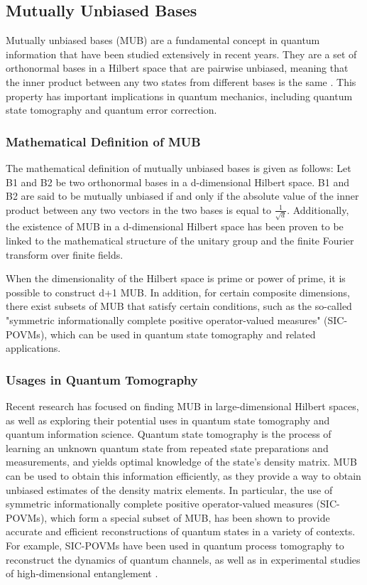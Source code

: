 \subsection{Mutually Unbiased Bases}\label{subsec:mutually-unbiased-bases}
Mutually unbiased bases (MUB) are a fundamental concept in quantum information that have been studied extensively in recent years.
They are a set of orthonormal bases in a Hilbert space that are pairwise unbiased, meaning that the inner product between
any two states from different bases is the same \cite{durt2010mutually}.
This property has important implications in quantum mechanics,
including quantum state tomography and quantum error correction.

\subsubsection{Mathematical Definition of MUB}\label{subsubsec:mathematical-definition-of-mub}
The mathematical definition of mutually unbiased bases is given as follows:
Let B1 and B2 be two orthonormal bases in a d-dimensional Hilbert space.
B1 and B2 are said to be mutually unbiased
if and only if the absolute value of the inner product between any two vectors in the two bases is equal to $\frac{1}{\sqrt {d}}$.
Additionally, the existence of MUB in a d-dimensional Hilbert space has been proven to be linked to the
mathematical structure of the unitary group and the finite Fourier transform over finite fields.

When the dimensionality of the Hilbert space is prime or power of prime, it is possible to construct d+1 MUB.
In addition, for certain composite dimensions, there exist subsets of MUB that satisfy certain conditions,
such as the so-called "symmetric informationally complete positive operator-valued measures" (SIC-POVMs),
which can be used in quantum state tomography and related applications.


\subsubsection{Usages in Quantum Tomography}
Recent research has focused on finding MUB in large-dimensional Hilbert spaces, as well as exploring their potential
uses in quantum state tomography and quantum information science.
Quantum state tomography is the process of learning an unknown quantum state from repeated state preparations and measurements,
and yields optimal knowledge of the state's density matrix. MUB can be used to obtain this information efficiently,
as they provide a way to obtain unbiased estimates of the density matrix elements. In particular, the use of symmetric
informationally complete positive operator-valued measures (SIC-POVMs), which form a special subset of MUB,
has been shown to provide accurate and efficient reconstructions of quantum states in a variety of contexts.
For example, SIC-POVMs have been used in quantum process tomography to reconstruct the dynamics of quantum channels,
as well as in experimental studies of high-dimensional entanglement \cite{ZhuHayashi2020}\cite{GrossEtAl2010}.

